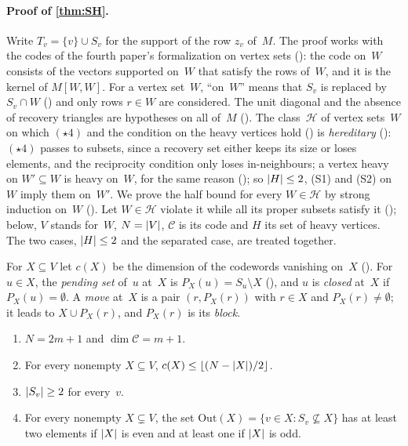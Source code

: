 \paragraph{Proof of \cref{thm:SH}.} Write $T_v=\{v\}\cup S_v$ for the support of the row $z_v$ of~$M$. The proof works with the
codes of the fourth paper's formalization on vertex sets (): the code on~$W$ consists of the
vectors supported on~$W$ that satisfy the rows of~$W$, and it is the kernel of $M[W,W]$. For a vertex set~$W$, ``on~$W$'' means
that $S_v$ is replaced by $S_v\cap W$ () and only rows $r\in W$ are considered. The unit diagonal and the absence of recovery
triangles are hypotheses on all of~$M$ (). The class~$\mathcal H$ of vertex sets~$W$ on which
$(\star4)$ and the condition on the heavy vertices hold () is \emph{hereditary} (): $(\star4)$
passes to subsets, since a recovery set either keeps its size or loses elements, and the reciprocity condition only loses
in-neighbours; a vertex heavy on $W'\subseteq W$ is heavy on~$W$, for the same reason
(); so $\lvert H \rvert\le2$, (S1) and (S2) on~$W$ imply them on~$W'$. We prove the half bound for every
$W\in\mathcal H$ by strong induction on~$W$ (). Let $W\in\mathcal H$ violate it while all its
proper subsets satisfy it (); below, $V$ stands for~$W$, $N=\lvert V \rvert$, $\mathcal C$ is its code and $H$ its set of
heavy vertices. The two cases, $\lvert H \rvert\le2$ and the separated case, are treated together.

For $X\subseteq V$ let $c(X)$ be the dimension of the codewords vanishing on~$X$ (). For $u\in X$, the
\emph{pending set} of~$u$ at~$X$ is $P_X(u)=S_u\setminus X$ (), and $u$ is \emph{closed} at~$X$ if
$P_X(u)=\emptyset$. A \emph{move} at~$X$ is a
pair $(r,P_X(r))$ with $r\in X$ and $P_X(r)\ne\emptyset$; it leads to $X\cup P_X(r)$, and $P_X(r)$ is its \emph{block}.

\begin{lemma}\label{lem:SH-axioms}
\begin{enumerate}[label=(\alph*)]
\item $N=2m+1$ and $\dim\mathcal C=m+1$.
\item For every nonempty $X\subseteq V$, $c(X)\le\lfloor(N-\lvert X \rvert)/2\rfloor$.
\item $\lvert S_v \rvert\ge2$ for every~$v$.
\item For every nonempty $X\subsetneq V$, the set $\mathrm{Out}(X)=\{v\in X:S_v\not\subseteq X\}$ has at least two elements if
$\lvert X \rvert$ is even and at least one if $\lvert X \rvert$ is odd.
\end{enumerate}
\end{lemma}

